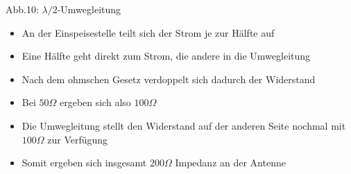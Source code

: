 \begin{frame}
\begin{minipage}{0.3\textwidth}
    {\tiny Abb.10: $\lambda /2$-Umwegleitung \cite{wp}}
  \end{minipage}
  \hspace{2mm}
  \begin{minipage}{0.5\textwidth}
    \begin{itemize}
      \item An der Einspeisestelle teilt sich der Strom je zur Hälfte auf
      \item Eine Hälfte geht direkt zum Strom, die andere in die Umwegleitung
      \item Nach dem ohmschen Gesetz verdoppelt sich dadurch der Widerstand
      \item Bei $50 \Omega$ ergeben sich also $100 \Omega$
      \item Die Umwegleitung stellt den Widerstand auf der anderen Seite nochmal mit $100 \Omega$ zur Verfügung
      \item Somit ergeben sich insgesamt $200 \Omega$ Impedanz an der Antenne
    \end{itemize}
  \end{minipage}
\end{frame}

